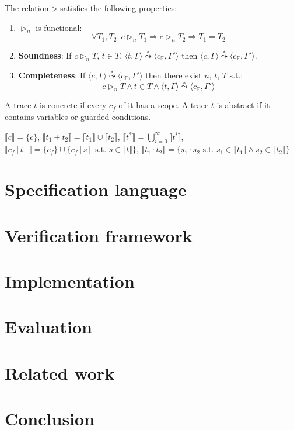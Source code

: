 \documentclass[runningheads]{llncs}
\newcommand{\conf}[1]{\langle #1 \rangle}
\newcommand{\eval}[1]{\llbracket #1 \rrbracket}
\newcommand{\cstate}{\mathtt{\Gamma}}
\begin{document}
\begin{proposition}
	The relation $\triangleright$ satisfies the following properties:
	\begin{enumerate}
		\item $\triangleright_n$ is functional:
		$$
		\forall T_1,T_2.~c \triangleright_n T_1 \Rightarrow c \triangleright_n T_2 \Rightarrow T_1 = T_2
		$$
		\item \textbf{Soundness}: If $c \triangleright_n T$, $t \in T$, $\conf{t,\cstate} \stackrel{*}{\leadsto} \conf{c_{\mathbb{F}},\cstate'}$ then $\conf{c,\cstate} \stackrel{*}{\leadsto} \conf{c_{\mathbb{F}},\cstate'}$.
		\item \textbf{Completeness}: If $\conf{c,\cstate} \stackrel{*}{\leadsto} \conf{c_{\mathbb{F}},\cstate'}$ then there exist $n$, $t$, $T$ s.t.:
		$$c \triangleright_n T \wedge t \in T \wedge \conf{t,\cstate} \stackrel{*}{\leadsto} \conf{c_{\mathbb{F}},\cstate'}$$
	\end{enumerate}
	\end{proposition}
\begin{definition}
	A trace $t$ is concrete if every $c_f$ of it has a scope. A trace $t$ is abstract if it contains variables or guarded conditions.
	\end{definition}

\begin{definition}
	$\eval{c} = \{c\}$, $\eval{t_1+t_2} = \eval{t_1} \cup \eval{t_2}$, $\eval{t^*} = \bigcup_{i=0}^\infty \eval{t^i}$, $\eval{c_f[t]} = \{c_f\} \cup \{c_f[s] \textrm{ s.t. } s \in \eval{t}\}$, $\eval{t_1 \cdot t_2} = \{s_1 \cdot s_2 \textrm{ s.t. } s_1 \in \eval{t_1} \wedge s_2 \in \eval{t_2}\}$ 
	\end{definition}



\section{Specification language}


\section{Verification framework}


\section{Implementation}

\section{Evaluation}

\section{Related work}

\section{Conclusion}
\end{document}
